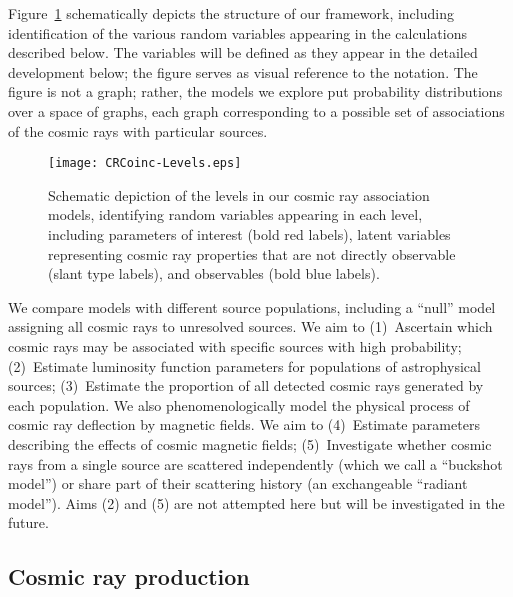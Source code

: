 Figure~\ref{fig:levels} schematically depicts the structure of our
framework, including identification of the various random variables
appearing in the calculations described below.  The variables will
be defined as they appear in the detailed development below; the
figure serves as visual reference to the notation.  The figure is
not a graph; rather, the models we explore put probability distributions
over a space of graphs, each graph corresponding to a possible set of
associations of the cosmic rays with particular sources.

\begin{figure}
\centerline{\texttt{[image: CRCoinc-Levels.eps]}}
\caption{Schematic depiction of the levels in our cosmic ray association
models, identifying random variables appearing in each level, including
parameters of interest (bold red labels), latent variables representing cosmic ray
properties that are not directly observable (slant type labels), and
observables (bold blue labels).}
\label{fig:levels}
\end{figure}

We compare models with different source populations, including a ``null''
model assigning all cosmic rays to unresolved sources.  We aim to
(1)~Ascertain which cosmic rays may be associated with specific sources with
high probability; (2)~Estimate luminosity function parameters for
populations of astrophysical sources; (3)~Estimate the proportion of all
detected cosmic rays generated by each population.  We also
phenomenologically model the physical process of cosmic ray deflection by
magnetic fields.  We aim to (4)~Estimate parameters describing the effects
of cosmic magnetic fields; (5)~Investigate whether cosmic rays from a single
source are scattered independently (which we call a ``buckshot model'') or
share part of their scattering history (an exchangeable ``radiant model'').
Aims (2) and (5) are not attempted here but will be investigated in the future.

\subsection{Cosmic ray production}


